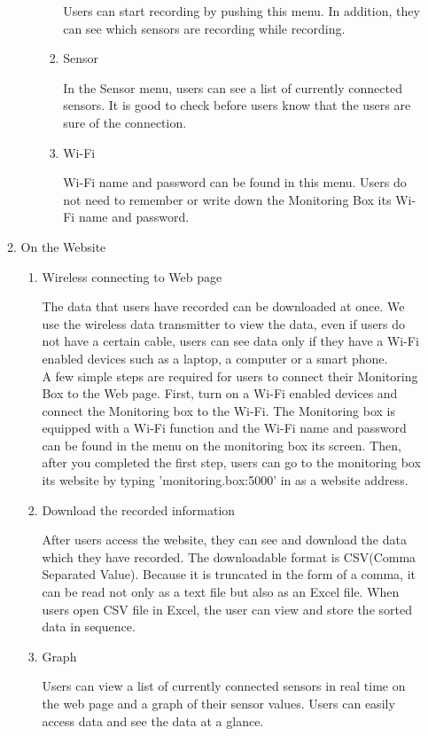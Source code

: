 \documentclass[conference]{IEEEtran}
\begin{document}
\begin{enumerate}
\begin{enumerate}
\begin{enumerate}
\begin{enumerate}
 Users can start recording by pushing this menu. In addition, they can see which sensors are recording while recording.\\
\item Sensor

 In the Sensor menu, users can see a list of currently connected sensors. It is good to check before users know that the users are sure of the connection.\\
\item Wi-Fi

 Wi-Fi name and password can be found in this menu. Users do not need to remember or write down the Monitoring Box its Wi-Fi name and password.\\
\end{enumerate}

\end{enumerate}

\item On the Website
\begin{enumerate}
\item Wireless connecting to Web page

 The data that users have recorded can be downloaded at once. We use the wireless data transmitter to view the data, even if users do not have a certain cable, users can see data only if they have a Wi-Fi enabled devices such as a laptop, a computer or a smart phone. \\
 A few simple steps are required for users to connect their Monitoring Box to the Web page. First, turn on a Wi-Fi enabled devices and connect the Monitoring box to the Wi-Fi. The Monitoring box is equipped with a Wi-Fi function and the Wi-Fi name and password can be found in the menu on the monitoring box its screen. Then, after you completed the first step, users can go to the monitoring box its website by typing 'monitoring.box:5000' in as a website address.\\

\item Download the recorded information

 After users access the website, they can see and download the data which they have recorded. The downloadable format is CSV(Comma Separated Value). Because it is truncated in the form of a comma, it can be read not only as a text file but also as an Excel file. When users open CSV file in Excel, the user can view and store the sorted data in sequence.\\

\item Graph

 Users can view a list of currently connected sensors in real time on the web page and a graph of their sensor values. Users can easily access data and see the data at a glance.\\

\end{enumerate}
\end{enumerate}
 
\end{enumerate}
\end{document}
